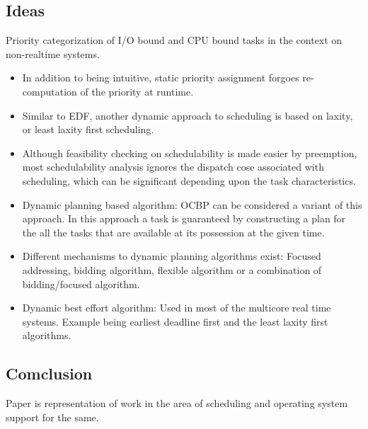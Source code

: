 \subsection{Ideas}
Priority categorization of I/O bound and CPU bound tasks in the context on non-realtime systems.
\begin{itemize}
	\item In addition to being intuitive, static priority assignment forgoes re-computation of the priority at runtime.
	\item Similar to EDF, another dynamic approach to scheduling is based on laxity, or least laxity first scheduling.
	\item Although feasibility checking on schedulability is made easier by preemption, most schedulability analysis ignores the dispatch cose associated with scheduling, which can be significant depending upon the task characteristics.
	\item Dynamic planning based algorithm: OCBP can be considered a variant of this approach. In this approach a task is guaranteed by constructing a plan for the all the tasks that are available at its possession at the given time.
	\item Different mechanisms to dynamic planning algorithms exist: Focused addressing, bidding algorithm, flexible algorithm or a combination of bidding/focused algorithm.
	\item Dynamic best effort algorithm: Used in most of the multicore real time systems. Example being earliest deadline first and the least laxity first algorithms.
\end{itemize}
\subsection{Comclusion}
Paper is representation of work in the area of scheduling and operating system support for the same.

